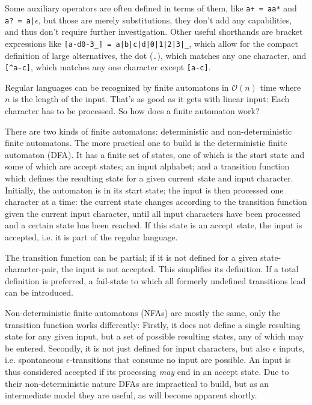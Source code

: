 			Some auxiliary operators are often defined in terms of them, like \lstinline$a+ = aa*$ and \lstinline$a? = a|$$\epsilon$, but those are merely substitutions, they don't add any capabilities, and thus don't require further investigation. Other useful shorthands are bracket expressions like \lstinline$[a-d0-3_] = a|b|c|d|0|1|2|3|_$, which allow for the compact definition of large alternatives, the dot (\lstinline$.$), which matches any one character, and \lstinline$[^a-c]$, which matches any one character except \lstinline$[a-c]$.
			
			Regular languages can be recognized by finite automatons in $\mathcal{O}(n)$ time where $n$ is the length of the input. That's as good as it gets with linear input: Each character has to be processed. So how does a finite automaton work?
			
			
			There are two kinds of finite automatons: deterministic and non-deterministic finite automatons. The more practical one to build is the deterministic finite automaton (DFA). It has a finite set of states, one of which is the start state and some of which are accept states; an input alphabet; and a transition function which defines the resulting state for a given current state and input character. Initially, the automaton is in its start state; the input is then processed one character at a time: the current state changes according to the transition function given the current input character, until all input characters have been processed and a certain state has been reached. If this state is an accept state, the input is accepted, i.e. it is part of the regular language.
			
			The transition function can be partial; if it is not defined for a given state-character-pair, the input is not accepted. This simplifies its definition. If a total definition is preferred, a fail-state to which all formerly undefined transitions lead can be introduced.
			
			Non-deterministic finite automatons (NFAs) are mostly the same, only the transition function works differently: Firstly, it does not define a single resulting state for any given input, but a set of possible resulting states, any of which may be entered. Secondly, it is not just defined for input characters, but also $\epsilon$ inputs, i.e. spontaneous $\epsilon$-transitions that consume no input are possible. An input is thus considered accepted if its processing \textit{may} end in an accept state. Due to their non-deterministic nature DFAs are impractical to build, but as an intermediate model they are useful, as will become apparent shortly.
			

